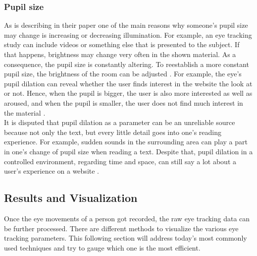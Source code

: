 \subsubsection{Pupil size}
As \textcite{goldberg2002eye} is describing in their paper one of the main reasons why someone's pupil size may change is increasing or decreasing illumination. For example, an eye tracking study can include videos or something else that is presented to the subject. If that happens, brightness may change very often in the shown material. As a consequence, the pupil size is constantly altering. To reestablish a more constant pupil size, the brightness of the room can be adjusted \autocite[]{goldberg2002eye}.
For example, the eye's pupil dilation can reveal whether the user finds interest in the website the look at or not. Hence, when the pupil is bigger, the user is also more interested as well as aroused, and when the pupil is smaller, the user does not find much interest in the material \autocite[]{joachims2017accurately}.\\
It is disputed that pupil dilation as a parameter can be an unreliable source because not only the text, but every little detail goes into one's reading experience. For example, sudden sounds in the surrounding area can play a part in one's change of pupil size when reading a text. 
Despite that, pupil dilation in a controlled environment, regarding time and space, can still say a lot about a user's experience on a website \autocite[]{bruneau2002eyes}.

\subsection{Results and Visualization}
\label{subsection:ResultsVisualization}
Once the eye movements of a person got recorded, the raw eye tracking data can be further processed. There are different methods to visualize the various eye tracking parameters. This following section will address today's most commonly used techniques and try to gauge which one is the most efficient.

